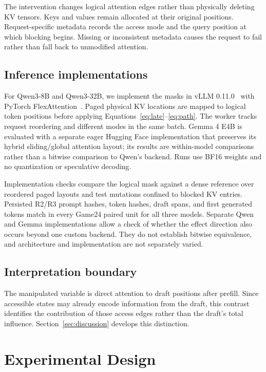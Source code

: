 \documentclass{article}
\begin{document}
The intervention changes logical attention edges rather than physically deleting KV tensors. Keys and values remain allocated at their original positions. Request-specific metadata records the access mode and the query position at which blocking begins. Missing or inconsistent metadata causes the request to fail rather than fall back to unmodified attention.

\subsection{Inference implementations}

For Qwen3-8B and Qwen3-32B, we implement the masks in vLLM 0.11.0~\citep{kwon2023pagedattention} with PyTorch FlexAttention~\citep{dong2024flexattention}. Paged physical KV locations are mapped to logical token positions before applying Equations~\ref{eq:late}--\ref{eq:path}. The worker tracks request reordering and different modes in the same batch. Gemma 4 E4B is evaluated with a separate eager Hugging Face implementation that preserves its hybrid sliding/global attention layout; its results are within-model comparisons rather than a bitwise comparison to Qwen's backend. Runs use BF16 weights and no quantization or speculative decoding.

Implementation checks compare the logical mask against a dense reference over reordered paged layouts and test mutations confined to blocked KV entries. Persisted R2/R3 prompt hashes, token hashes, draft spans, and first generated tokens match in every Game24 paired unit for all three models. Separate Qwen and Gemma implementations allow a check of whether the effect direction also occurs beyond one custom backend. They do not establish bitwise equivalence, and architecture and implementation are not separately varied.

\subsection{Interpretation boundary}

The manipulated variable is direct attention to draft positions after prefill. Since accessible states may already encode information from the draft, this contrast identifies the contribution of those access edges rather than the draft's total influence. Section~\ref{sec:discussion} develops this distinction.

\section{Experimental Design}
\label{sec:experiments}
\end{document}
